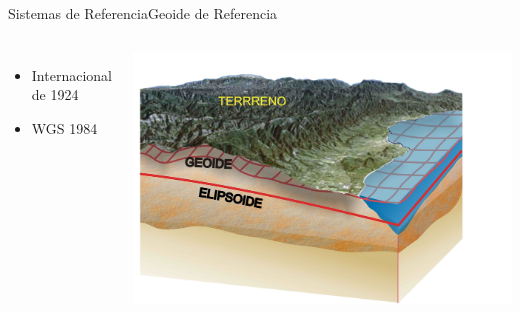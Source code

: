 \documentclass{beamer}
\begin{document}
\begin{frame}{Sistemas de Referencia}{Geoide de Referencia}
	\begin{columns}[]
		\begin{itemize}
			\item Internacional de 1924
			\item WGS 1984
		\end{itemize}
		\includegraphics[width=\textwidth]{geoide}
	\end{columns}
\end{frame}
\end{document}
